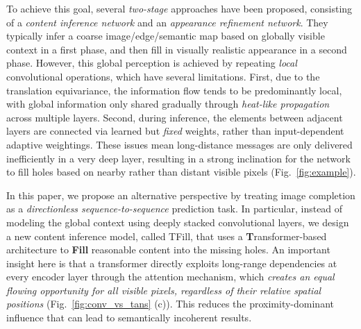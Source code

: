 \documentclass[10pt,twocolumn,letterpaper]{article}
\begin{document}
To achieve this goal, several \emph{two-stage} approaches \cite{yu2018generative,Nazeri_2019_ICCV,yi2020contextual,peng2021generating,zeng2021generative} have been proposed, consisting of a \emph{content inference network} and an \emph{appearance refinement network}. They typically infer a coarse image/edge/semantic map based on globally visible context in a first phase, and then fill in visually realistic appearance in a second phase. However, this global perception is achieved by repeating \emph{local} convolutional operations, which have several limitations. First, due to the translation equivariance, the information flow tends to be predominantly local, with global information only shared gradually through \emph{heat-like propagation} across multiple layers. Second, during inference, the elements between adjacent layers are connected via learned but \emph{fixed} weights, rather than input-dependent adaptive weightings. These issues mean long-distance messages are only delivered inefficiently in a very deep layer, resulting in a strong inclination for the network to fill holes based on nearby rather than distant visible pixels (\cf Fig.~\ref{fig:example}). 

In this paper, we propose an alternative perspective by treating image completion as a \emph{directionless sequence-to-sequence} prediction task. In particular, instead of modeling the global context using deeply stacked convolutional layers, we design a new content inference model, called TFill, that uses a \textbf{T}ransformer-based architecture to \textbf{Fill} reasonable content into the missing holes. An important insight here is that a transformer directly exploits long-range dependencies at every encoder layer through the attention mechanism, which \emph{creates an equal flowing opportunity for all visible pixels, regardless of their relative spatial positions} (Fig.~\ref{fig:conv_vs_tans} (c)). This reduces the proximity-dominant influence that can lead to semantically incoherent results.
\end{document}
